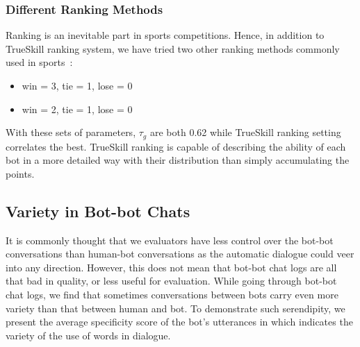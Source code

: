 
 
\subsubsection{Different Ranking Methods}
Ranking is an inevitable part in sports competitions.
Hence, in addition to TrueSkill ranking system,
 we have tried two other ranking methods commonly used in
sports~\cite{wiki-sport-scoring}:
\begin{itemize}
\item win = 3, tie = 1, lose = 0
\item win = 2, tie = 1, lose = 0
\end{itemize}

With these sets of parameters, 
 $\tau_g$ are both 0.62 while TrueSkill ranking setting correlates the best. 
TrueSkill ranking is capable of describing the ability of each bot in a more detailed way with their distribution than simply accumulating the points.


\subsection{Variety in Bot-bot Chats}
\label{sec:diversity}
It is commonly thought that we evaluators have less control over
the bot-bot conversations than human-bot conversations as the automatic dialogue could veer into
any direction. 
However, this does not mean that bot-bot chat logs are all that bad in quality, 
or less useful for evaluation.
While going through bot-bot chat logs, 
we find that sometimes 
conversations between bots 
carry even more variety than that between human and bot. 
To demonstrate such serendipity, 
we present the average specificity score of the bot's utterances
in  which indicates the variety of the use 
of words in dialogue.  


